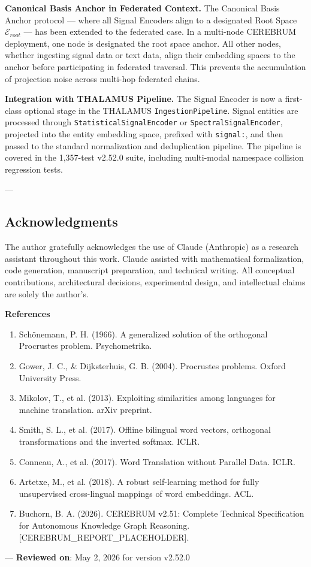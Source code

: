 \textbf{Canonical Basis Anchor in Federated Context.} The Canonical Basis Anchor protocol — where all Signal Encoders align to a designated Root Space $\mathcal{E}_{root}$ — has been extended to the federated case. In a multi-node CEREBRUM deployment, one node is designated the root space anchor. All other nodes, whether ingesting signal data or text data, align their embedding spaces to the anchor before parti\-cipating in federated traversal. This prevents the accum\-ulation of projection noise across multi-hop federated chains.

\textbf{Integration with THALAMUS Pipeline.} The Signal Encoder is now a first-class optional stage in the THALAMUS \texttt{IngestionPipeline}. Signal entities are processed through \texttt{StatisticalSignalEncoder} or \texttt{SpectralSignalEncoder}, projected into the entity embedding space, prefixed with \texttt{signal:}, and then passed to the standard norma\-lization and dedup\-lication pipeline. The pipeline is covered in the 1,357-test v2.52.0 suite, including multi-modal namespace collision regression tests.

---
\subsection{Acknow\-ledgments}

The author gratefully ackno\-wledges the use of Claude (Anthropic) as a research assistant throughout this work. Claude assisted with mathe\-matical forma\-lization, code generation, manuscript preparation, and technical writing. All conceptual contr\-ibutions, archi\-tectural decisions, exper\-imental design, and intel\-lectual claims are solely the author's.

\textbf{References}
\begin{enumerate}
\item Schönemann, P. H. (1966). A generalized solution of the orthogonal Procrustes problem. Psycho\-metrika.
\item Gower, J. C., \& Dijkst\-erhuis, G. B. (2004). Procrustes problems. Oxford University Press.
\item Mikolov, T., et al. (2013). Exploiting simil\-arities among languages for machine translation. arXiv preprint.
\item Smith, S. L., et al. (2017). Offline bilingual word vectors, orthogonal trans\-formations and the inverted softmax. ICLR.
\item Conneau, A., et al. (2017). Word Translation without Parallel Data. ICLR.
\item Artetxe, M., et al. (2018). A robust self-learning method for fully unsup\-ervised cross-lingual mappings of word embeddings. ACL.
\item Buchorn, B. A. (2026). CEREBRUM v2.51: Complete Technical Specif\-ication for Autonomous Knowledge Graph Reasoning. [CEREBRUM\_REPORT\_PLACEHOLDER].

\end{enumerate}
---
\textbf{Reviewed on}: May 2, 2026 for version v2.52.0
